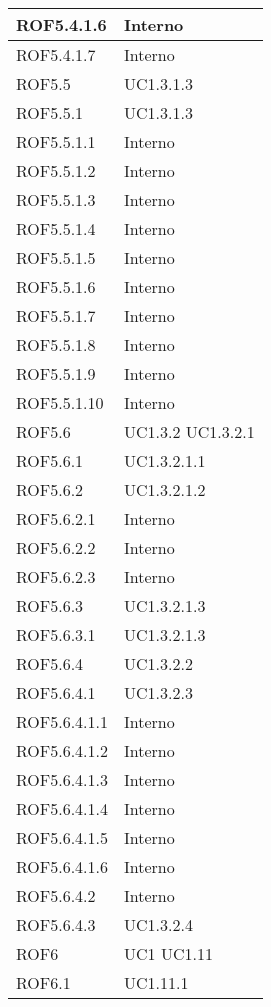 \begin{center}
\begin{longtable}{| p{4cm} | p{4cm} |}
\hline
ROF5.4.1.6   &  Interno \\
\hline
ROF5.4.1.7   &  Interno \\
\hline
ROF5.5   &  UC1.3.1.3  \\
\hline
ROF5.5.1   &  UC1.3.1.3  \\
\hline
ROF5.5.1.1   &  Interno \\
\hline
ROF5.5.1.2   &  Interno \\
\hline
ROF5.5.1.3   &  Interno \\
\hline
ROF5.5.1.4   &  Interno \\
\hline
ROF5.5.1.5   &  Interno \\
\hline
ROF5.5.1.6   &  Interno \\
\hline
ROF5.5.1.7   &  Interno \\
\hline
ROF5.5.1.8   &  Interno \\
\hline
ROF5.5.1.9   &  Interno \\
\hline
ROF5.5.1.10   &  Interno \\
\hline
ROF5.6   &  UC1.3.2 \newline UC1.3.2.1 \\
\hline
ROF5.6.1   &  UC1.3.2.1.1 \\
\hline
ROF5.6.2   &  UC1.3.2.1.2 \\
\hline
ROF5.6.2.1   &  Interno \\
\hline
ROF5.6.2.2   &  Interno \\
\hline
ROF5.6.2.3   &  Interno \\
\hline
ROF5.6.3   &  UC1.3.2.1.3 \\
\hline
ROF5.6.3.1   &  UC1.3.2.1.3 \\
\hline
ROF5.6.4   &  UC1.3.2.2 \\
\hline
ROF5.6.4.1   &  UC1.3.2.3 \\
\hline
ROF5.6.4.1.1   &  Interno \\
\hline
ROF5.6.4.1.2   &  Interno \\
\hline
ROF5.6.4.1.3   &  Interno \\
\hline
ROF5.6.4.1.4   &  Interno \\
\hline
ROF5.6.4.1.5   &  Interno \\
\hline
ROF5.6.4.1.6   &  Interno \\
\hline
ROF5.6.4.2   &  Interno \\
\hline
ROF5.6.4.3   &  UC1.3.2.4 \\
\hline
ROF6   &  UC1 \newline UC1.11 \\
\hline
ROF6.1   &  UC1.11.1 \\

\end{longtable}
\end{center}
